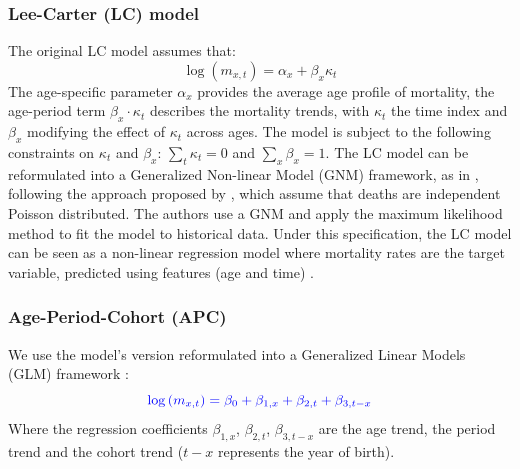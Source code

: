 \documentclass[fleqn,10pt]{wlscirep}
\begin{document}
\subsubsection*{Lee-Carter (LC) model}
The original LC model\cite{LC92} assumes that:
\begin{equation} 
\label{eq:LC}
\log{\left(m_{x,t}\right)}=\alpha_{x}+\beta_{x} \kappa_{t}
\end{equation}
The age-specific parameter $\alpha_x$ provides the average age profile of mortality, the age-period term $\beta_{x}\cdot\kappa_t$ describes the mortality trends, with $\kappa_t$ the time index and $\beta_{x}$ modifying the effect of $\kappa_t$ across ages. The model is subject to the following constraints on $\kappa_t$ and $\beta_x$: $\sum_{t}{\kappa_t}=0$ and $\sum_{x}{\beta_x}=1$.
\color{blue}The LC model can be reformulated into a Generalized Non-linear Model (GNM) framework, as in \cite{Villegas2018}, following the approach proposed by \cite{BDV2002}, which assume that deaths are independent Poisson distributed. The authors use a GNM and apply the maximum likelihood method to fit the model to historical data. Under this specification, the LC model can be seen as a non-linear regression model where mortality rates are the target variable, predicted using features (age and time) \cite{RichmanWuthrich}. \color{black}

\subsubsection*{Age-Period-Cohort (APC)}
We use the model's version reformulated into a Generalized Linear Models (GLM) framework \cite{Alai2014}:
\begin{equation} 
\label{eq:APC}
\color{blue} \log{\left(m_{x,t}\right)}=\beta_{0} +\beta_{1,x}+\beta_{2,t} +\beta_{3,t-x}
\end{equation}
Where the regression coefficients $\beta_{1,x}$, $\beta_{2,t}$, \color{blue}$\beta_{3,t-x}$ \color{black} are the age trend, the period trend and the cohort trend \color{blue}($t-x$ represents the year of birth)\color{black}.
\end{document}
